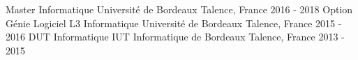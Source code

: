 \begin{cventries}
	\cventry
	{Master Informatique}
	{Université de Bordeaux}
	{Talence, France}
	{2016 - 2018}
	{Option Génie Logiciel}
	\cventry
	{L3 Informatique}
	{Université de Bordeaux}
	{Talence, France}
	{2015 - 2016}
	{}
	\cventry
	{DUT Informatique}
	{IUT Informatique de Bordeaux}
	{Talence, France}
	{2013 - 2015}
	{}
\end{cventries}